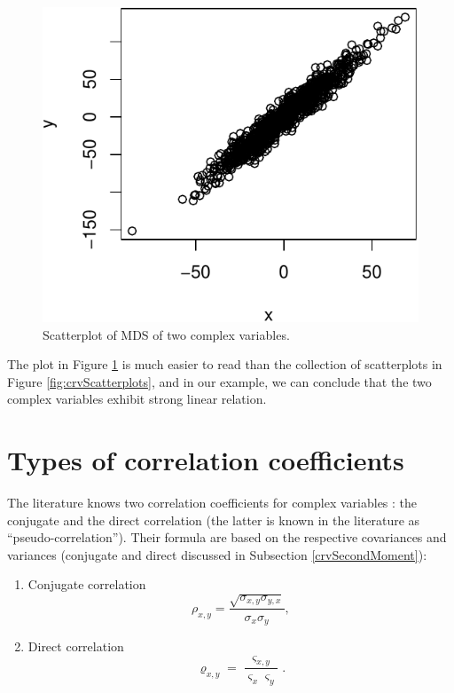 \documentclass[
]{book}
\begin{document}
\begin{figure}
\centering
\includegraphics{Svetunkov---Svetunkov---Complex-Valued-Econometrics_files/figure-latex/crvScatterplotMDS-1.pdf}
\caption{\label{fig:crvScatterplotMDS}Scatterplot of MDS of two complex variables.}
\end{figure}

The plot in Figure \ref{fig:crvScatterplotMDS} is much easier to read than the collection of scatterplots in Figure \ref{fig:crvScatterplots}, and in our example, we can conclude that the two complex variables exhibit strong linear relation.

\hypertarget{correlationTypes}{%
\section{Types of correlation coefficients}\label{correlationTypes}}

The literature knows two correlation coefficients for complex variables \citep{ref}: the conjugate and the direct correlation (the latter is known in the literature as ``pseudo-correlation''). Their formula are based on the respective covariances and variances (conjugate and direct discussed in Subsection \ref{crvSecondMoment}):

\begin{enumerate}
\def\labelenumi{\arabic{enumi}.}
\item
  Conjugate correlation
  \begin{equation}
   \rho_{x,y} = \frac{\sqrt{\sigma_{x,y} \sigma_{y,x}}}{\sigma_x \sigma_y},
   \label{eq:correlationConjugate}
  \end{equation}
\item
  Direct correlation
  \begin{equation}
   \varrho_{x,y} = \frac{\varsigma_{x,y}}{\varsigma_x \varsigma_y}.
   \label{eq:correlationDirect}
  \end{equation}
\end{enumerate}
\end{document}
